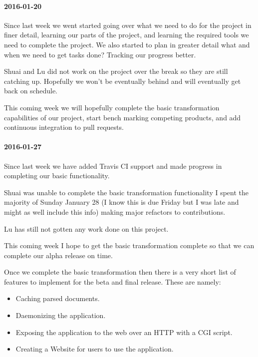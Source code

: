\paragraph{2016-01-20}

Since last week we went started going over what we need to do for the project in finer detail, learning our parts of the project, and learning the required tools we need to complete the project.
We also started to plan in greater detail what and when we need to get tasks done? Tracking our progress better.

Shuai and Lu did not work on the project over the break so they are still catching up.
Hopefully we won't be eventually behind and will eventually get back on schedule.

This coming week we will hopefully complete the basic transformation capabilities of our project, start bench marking competing products, and add continuous integration to pull requests.

\paragraph{2016-01-27}

Since last week we have added Travis CI support and made progress in completing our basic functionality.

Shuai was unable to complete the basic transformation functionality I spent the majority of Sunday January 28 (I know this is due Friday but I was late and might as well include this info) making major refactors to contributions.

Lu has still not gotten any work done on this project.

This coming week I hope to get the basic transformation complete so that we can complete our alpha release on time.

Once we complete the basic transformation then there is a very short list of features to implement for the beta and final release.
These are namely:

\begin{itemize}
  \item Caching parsed documents.
  \item Daemonizing the application.
  \item Exposing the application to the web over an HTTP with a CGI script.
  \item Creating a Website for users to use the application.
\end{itemize}

